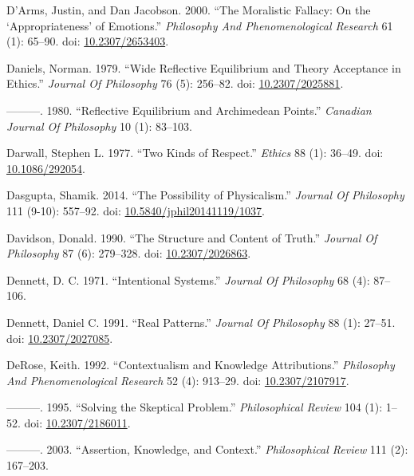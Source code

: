 \documentclass[
  10pt,
  letterpaper,
  DIV=11,
  numbers=noendperiod,
  twoside]{scrartcl}
\newlength{\cslhangindent}
\newenvironment{CSLReferences}[2] %
 {\begin{list}{}{%
  \setlength{\itemindent}{0pt}
  \setlength{\leftmargin}{0pt}
  \setlength{\parsep}{0pt}
  \ifodd #1
   \setlength{\leftmargin}{\cslhangindent}
   \setlength{\itemindent}{-1\cslhangindent}
  \fi
  \setlength{\itemsep}{#2\baselineskip}}}
 {\end{list}}
\begin{document}
\begin{CSLReferences}{1}{0}
D'Arms, Justin, and Dan Jacobson. 2000. {``The Moralistic Fallacy: On
the {`Appropriateness'} of Emotions.''} \emph{Philosophy And
Phenomenological Research} 61 (1): 65--90. doi:
\href{https://doi.org/10.2307/2653403}{10.2307/2653403}.

Daniels, Norman. 1979. {``Wide Reflective Equilibrium and Theory
Acceptance in Ethics.''} \emph{Journal Of Philosophy} 76 (5): 256--82.
doi: \href{https://doi.org/10.2307/2025881}{10.2307/2025881}.

---------. 1980. {``Reflective Equilibrium and Archimedean Points.''}
\emph{Canadian Journal Of Philosophy} 10 (1): 83--103.

Darwall, Stephen L. 1977. {``Two Kinds of Respect.''} \emph{Ethics} 88
(1): 36--49. doi: \href{https://doi.org/10.1086/292054}{10.1086/292054}.

Dasgupta, Shamik. 2014. {``The Possibility of Physicalism.''}
\emph{Journal Of Philosophy} 111 (9-10): 557--92. doi:
\href{https://doi.org/10.5840/jphil20141119/1037}{10.5840/jphil20141119/1037}.

Davidson, Donald. 1990. {``The Structure and Content of Truth.''}
\emph{Journal Of Philosophy} 87 (6): 279--328. doi:
\href{https://doi.org/10.2307/2026863}{10.2307/2026863}.

Dennett, D. C. 1971. {``Intentional Systems.''} \emph{Journal Of
Philosophy} 68 (4): 87--106.

Dennett, Daniel C. 1991. {``Real Patterns.''} \emph{Journal Of
Philosophy} 88 (1): 27--51. doi:
\href{https://doi.org/10.2307/2027085}{10.2307/2027085}.

DeRose, Keith. 1992. {``Contextualism and Knowledge Attributions.''}
\emph{Philosophy And Phenomenological Research} 52 (4): 913--29. doi:
\href{https://doi.org/10.2307/2107917}{10.2307/2107917}.

---------. 1995. {``Solving the Skeptical Problem.''}
\emph{Philosophical Review} 104 (1): 1--52. doi:
\href{https://doi.org/10.2307/2186011}{10.2307/2186011}.

---------. 2003. {``Assertion, Knowledge, and Context.''}
\emph{Philosophical Review} 111 (2): 167--203.


\end{CSLReferences}
\end{document}
